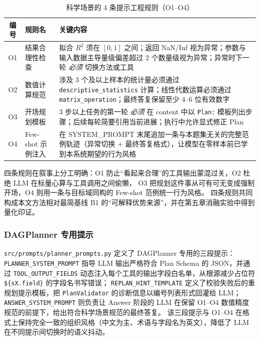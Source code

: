 \begin{table}[htbp]
    \centering
    \caption{\label{tab:o1-o4}科学场景的 4 条提示工程规则（O1--O4）}
    \begin{tabularx}{\linewidth}{clX}
        \toprule
        编号 & 规则名 & 关键内容 \\ \midrule
        O1 & 结果合理性检查 & 拟合 $R^2$ 须在 $[0,1]$ 之间；返回 NaN/Inf 视为异常；参数与输入数据主导量级偏差超过 2 个数量级视为异常；异常时下一轮 \emph{必须} 切换方法或工具 \\
        O2 & 数值计算规范 & 涉及 3 个及以上样本的统计量必须通过 \texttt{descriptive\_statistics} 计算；线性代数运算必须通过 \texttt{matrix\_operation}；最终答复保留至少 4--6 位有效数字 \\
        O3 & 开场规划模板 & 3 步以上任务的第一轮 \emph{必须} 在 content 中以 \texttt{Plan:} 模板列出步骤；后续每轮简要引用当前进展；执行中允许显式修正 Plan \\
        O4 & Few-shot 示例注入 & 在 SYSTEM\_PROMPT 末尾追加一条与本题集无关的完整范例轨迹（异常切换 + 最终答复格式），让模型在零样本前已学到本系统期望的行为风格 \\ \bottomrule
    \end{tabularx}
\end{table}

四条规则在叙事上分工明确：O1 防止“看起来合理”的工具输出蒙混过关，O2 杜绝 LLM 在标量心算与工具调用之间偷懒，
O3 把规划这件事从可有可无变成强制开场，O4 则用一条与目标域同构的 Few-shot 范例统一行为风格。
四条规则共同构成本文方法相对最简基线 B1 的“可解释优势来源”，并在第五章消融实验中得到量化印证。

\subsubsection{DAGPlanner 专用提示}

\texttt{src/prompts/\allowbreak planner\_prompts.py} 定义了 DAGPlanner 专用的三段提示：
\texttt{PLANNER\_SYSTEM\_PROMPT} 指导 LLM 输出严格符合 Plan Schema 的 JSON，并通过 \texttt{TOOL\_OUTPUT\_FIELDS} 动态注入每个工具的输出字段白名单，从根源减少占位符 \verb|${sX.field}| 的字段名书写错误；
\texttt{REPLAN\_HINT\_TEMPLATE} 定义了校验失败后的重规划提示模板，把 \texttt{PlanValidator} 的诊断信息以编号列表形式回灌给 LLM；
\texttt{ANSWER\_SYSTEM\_PROMPT} 则负责让 Answer 阶段的 LLM 在保留 O1--O4 数值精度规范的前提下，给出符合科学场景规范的最终答复。
该三段提示与 O1--O4 在格式上保持完全一致的组织风格（中文为主、术语与字段名为英文），降低了 LLM 在不同提示间切换时的语义抖动。

